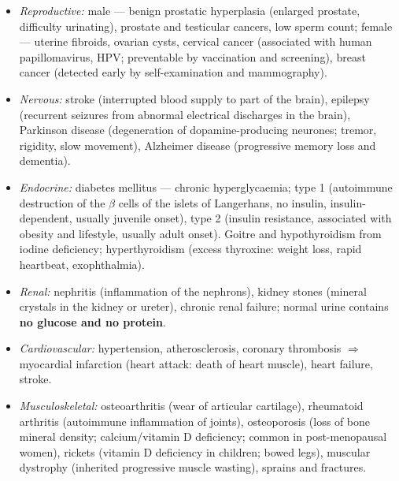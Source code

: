 \documentclass[11pt]{article}
\newcommand{\cle}[1]{{\popxbold\color{popdark}#1}}
\begin{document}
\begin{aretenir}
\begin{itemize}
\item \emph{Reproductive:} male — benign prostatic hyperplasia (enlarged prostate, difficulty urinating), prostate and testicular cancers, low sperm count; female — uterine fibroids, ovarian cysts, cervical cancer (associated with human papillomavirus, HPV; preventable by vaccination and screening), breast cancer (detected early by self-examination and mammography).
\item \emph{Nervous:} \cle{stroke} (interrupted blood supply to part of the brain), \cle{epilepsy} (recurrent seizures from abnormal electrical discharges in the brain), \cle{Parkinson disease} (degeneration of dopamine-producing neurones; tremor, rigidity, slow movement), \cle{Alzheimer disease} (progressive memory loss and dementia).
\item \emph{Endocrine:} \cle{diabetes mellitus} — chronic hyperglycaemia; type 1 (autoimmune destruction of the $\beta$ cells of the islets of Langerhans, no insulin, insulin-dependent, usually juvenile onset), type 2 (insulin resistance, associated with obesity and lifestyle, usually adult onset). \cle{Goitre} and hypothyroidism from iodine deficiency; hyperthyroidism (excess thyroxine: weight loss, rapid heartbeat, exophthalmia).
\item \emph{Renal:} nephritis (inflammation of the nephrons), kidney stones (mineral crystals in the kidney or ureter), chronic renal failure; normal urine contains \textbf{no glucose and no protein}.
\item \emph{Cardiovascular:} hypertension, atherosclerosis, coronary thrombosis $\Rightarrow$ \cle{myocardial infarction} (heart attack: death of heart muscle), heart failure, stroke.
\item \emph{Musculoskeletal:} \cle{osteoarthritis} (wear of articular cartilage), \cle{rheumatoid arthritis} (autoimmune inflammation of joints), \cle{osteoporosis} (loss of bone mineral density; calcium/vitamin D deficiency; common in post-menopausal women), \cle{rickets} (vitamin D deficiency in children; bowed legs), muscular dystrophy (inherited progressive muscle wasting), sprains and fractures.
\end{itemize}
\end{aretenir}
\end{document}
